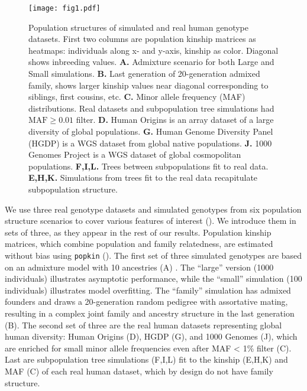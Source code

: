 \documentclass[9pt,lineno]{elife}
\begin{document}
\begin{figure}
  \begin{fullwidth}
    \texttt{[image: fig1.pdf]}
    \caption{
      Population structures of simulated and real human genotype datasets.
      First two columns are population kinship matrices as heatmaps: individuals along x- and y-axis, kinship as color.
      Diagonal shows inbreeding values.
      \textbf{A.}
      Admixture scenario for both Large and Small simulations.
      \textbf{B.}
      Last generation of 20-generation admixed family, shows larger kinship values near diagonal corresponding to siblings, first cousins, etc.
      \textbf{C.}
      Minor allele frequency (MAF) distributions.
      Real datasets and subpopulation tree simulations had $\text{MAF} \ge 0.01$ filter.
      \textbf{D.}
      Human Origins is an array dataset of a large diversity of global populations.
      \textbf{G.}
      Human Genome Diversity Panel (HGDP) is a WGS dataset from global native populations.
      \textbf{J.}
      1000 Genomes Project is a WGS dataset of global cosmopolitan populations.
      \textbf{F,I,L.}
      Trees between subpopulations fit to real data.
      \textbf{E,H,K.}
      Simulations from trees fit to the real data recapitulate subpopulation structure.
    }
    \label{fig:kinship}
  \end{fullwidth}
\end{figure}

We use three real genotype datasets and simulated genotypes from six population structure scenarios to cover various features of interest ().
We introduce them in sets of three, as they appear in the rest of our results.
Population kinship matrices, which combine population and family relatedness, are estimated without bias using \texttt{popkin} \citep{ochoa_estimating_2021} ().
The first set of three simulated genotypes are based on an admixture model with 10 ancestries (A) \citep{ochoa_estimating_2021, gopalan_scaling_2016, cabreros_likelihood-free_2019}.
The ``large'' version (1000 individuals) illustrates asymptotic performance, while the ``small'' simulation (100 individuals) illustrates model overfitting.
The ``family'' simulation has admixed founders and draws a 20-generation random pedigree with assortative mating, resulting in a complex joint family and ancestry structure in the last generation (B).
The second set of three are the real human datasets representing global human diversity: Human Origins (D), HGDP (G), and 1000 Genomes (J), which are enriched for small minor allele frequencies even after MAF < 1\% filter (C).
Last are subpopulation tree simulations (F,I,L) fit to the kinship (E,H,K) and MAF (C) of each real human dataset, which by design do not have family structure.
\end{document}
